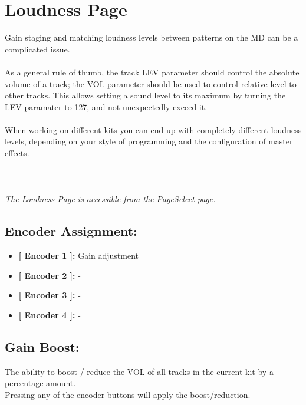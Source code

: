 \chapter{Loudness Page}
Gain staging and matching loudness levels between patterns on the MD can be a complicated issue.\\
\\
As a general rule of thumb, the track LEV parameter should control the absolute volume of a track; the VOL parameter should be used to control relative level to other tracks. This allows setting a sound level to its maximum by turning the LEV paramater to 127, and not unexpectedly exceed it.\\
\\
When working on different kits you can end up with completely different loudness levels, depending on your style of programming and the configuration of master effects.\\\\
\\\\\textit{The Loudness Page is accessible from the PageSelect page.}
\section{Encoder Assignment:}
\begin{itemize}
	\item \textbf{[ Encoder 1 ]: } Gain adjustment
	\item \textbf{[ Encoder 2 ]: } -
    \item \textbf{[ Encoder 3 ]: } -
	\item \textbf{[ Encoder 4 ]: } -
\end{itemize}

\section{Gain Boost:}
The ability to boost / reduce the VOL of all tracks in the current kit by a percentage amount.
\\Pressing any of the encoder buttons will apply the boost/reduction.
